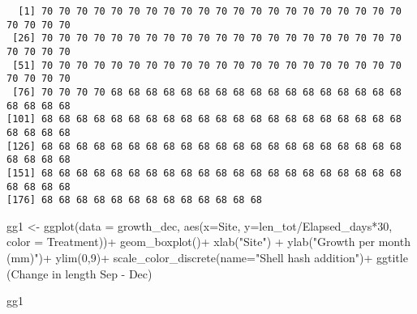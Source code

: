 \documentclass[
  letterpaper,
  DIV=11,
  numbers=noendperiod]{scrartcl}
\newenvironment{Shaded}{\begin{snugshade}}{\end{snugshade}}
\newcommand{\AttributeTok}[1]{\textcolor[rgb]{0.40,0.45,0.13}{#1}}
\newcommand{\CommentTok}[1]{\textcolor[rgb]{0.37,0.37,0.37}{#1}}
\newcommand{\DecValTok}[1]{\textcolor[rgb]{0.68,0.00,0.00}{#1}}
\newcommand{\FunctionTok}[1]{\textcolor[rgb]{0.28,0.35,0.67}{#1}}
\newcommand{\NormalTok}[1]{\textcolor[rgb]{0.00,0.23,0.31}{#1}}
\newcommand{\OtherTok}[1]{\textcolor[rgb]{0.00,0.23,0.31}{#1}}
\newcommand{\SpecialCharTok}[1]{\textcolor[rgb]{0.37,0.37,0.37}{#1}}
\newcommand{\StringTok}[1]{\textcolor[rgb]{0.13,0.47,0.30}{#1}}
\begin{document}
\begin{Shaded}
\end{Shaded}

\begin{Shaded}
\end{Shaded}

\begin{verbatim}
  [1] 70 70 70 70 70 70 70 70 70 70 70 70 70 70 70 70 70 70 70 70 70 70 70 70 70
 [26] 70 70 70 70 70 70 70 70 70 70 70 70 70 70 70 70 70 70 70 70 70 70 70 70 70
 [51] 70 70 70 70 70 70 70 70 70 70 70 70 70 70 70 70 70 70 70 70 70 70 70 70 70
 [76] 70 70 70 70 68 68 68 68 68 68 68 68 68 68 68 68 68 68 68 68 68 68 68 68 68
[101] 68 68 68 68 68 68 68 68 68 68 68 68 68 68 68 68 68 68 68 68 68 68 68 68 68
[126] 68 68 68 68 68 68 68 68 68 68 68 68 68 68 68 68 68 68 68 68 68 68 68 68 68
[151] 68 68 68 68 68 68 68 68 68 68 68 68 68 68 68 68 68 68 68 68 68 68 68 68 68
[176] 68 68 68 68 68 68 68 68 68 68 68 68 68
\end{verbatim}

\begin{Shaded}
\begin{Highlighting}[]
\NormalTok{gg1 }\OtherTok{\textless{}{-}} \FunctionTok{ggplot}\NormalTok{(}\AttributeTok{data =}\NormalTok{ growth\_dec, }\FunctionTok{aes}\NormalTok{(}\AttributeTok{x=}\NormalTok{Site, }\AttributeTok{y=}\NormalTok{len\_tot}\SpecialCharTok{/}\NormalTok{Elapsed\_days}\SpecialCharTok{*}\DecValTok{30}\NormalTok{, }\AttributeTok{color =}\NormalTok{ Treatment))}\SpecialCharTok{+}
  \FunctionTok{geom\_boxplot}\NormalTok{()}\SpecialCharTok{+}
  \FunctionTok{xlab}\NormalTok{(}\StringTok{"Site"}\NormalTok{) }\SpecialCharTok{+} 
  \FunctionTok{ylab}\NormalTok{(}\StringTok{"Growth per month (mm)"}\NormalTok{)}\SpecialCharTok{+}
  \FunctionTok{ylim}\NormalTok{(}\DecValTok{0}\NormalTok{,}\DecValTok{9}\NormalTok{)}\SpecialCharTok{+}
  \FunctionTok{scale\_color\_discrete}\NormalTok{(}\AttributeTok{name=}\StringTok{"Shell hash addition"}\NormalTok{)}\SpecialCharTok{+}
  \FunctionTok{ggtitle}\NormalTok{ (}\StringTok{\textquotesingle{}Change in length Sep {-} Dec\textquotesingle{}}\NormalTok{)}

\NormalTok{gg1}
\end{Highlighting}
\end{Shaded}
\end{document}
